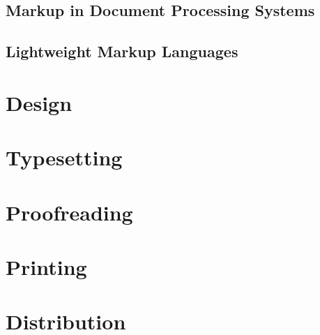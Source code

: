 \documentclass{book}
\begin{document}

        
      \section{Markup in Document Processing Systems}

      \section{Lightweight Markup Languages}

    \chapter{Design}
    \chapter{Typesetting}
    \chapter{Proofreading}
    \chapter{Printing}
    \chapter{Distribution}
\end{document}
